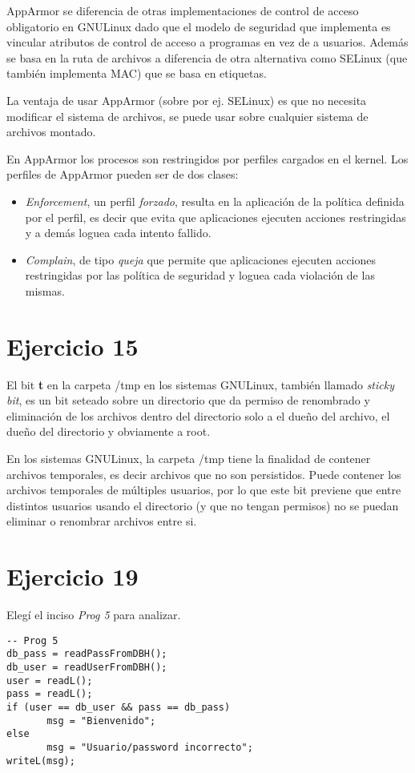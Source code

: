 \documentclass[12pt]{article}%
\begin{document}
AppArmor se diferencia de otras implementaciones de control de acceso
obligatorio en GNU\-Linux dado que el modelo de seguridad que
implementa es vincular atributos de control de acceso a programas en
vez de a usuarios. Además se basa en la ruta de archivos a diferencia
de otra alternativa como SELinux (que también implementa MAC) que se
basa en etiquetas.

La ventaja de usar AppArmor (sobre por ej. SELinux) es que no necesita
modificar el sistema de archivos, se puede usar sobre cualquier
sistema de archivos montado.

En AppArmor los procesos son restringidos por perfiles cargados en el
kernel. Los perfiles de AppArmor pueden ser de dos clases:
\begin{itemize}
\item \textit{Enforcement}, un perfil \textit{forzado}, resulta en la
  aplicación de la política definida por el perfil, es decir que evita
  que aplicaciones ejecuten acciones restringidas y a demás loguea cada
  intento fallido.
\item \textit{Complain}, de tipo \textit{queja} que permite que aplicaciones
  ejecuten acciones restringidas por las política de seguridad y
  loguea cada violación de las mismas.
\end{itemize}

\section*{Ejercicio 15}
El bit \textbf{t} en la carpeta /tmp en los sistemas GNU\-Linux,
también llamado \textit{sticky bit}, es un bit seteado sobre un
directorio que da permiso de renombrado y eliminación de los
archivos dentro del directorio solo a el dueño del archivo, el dueño
del directorio y obviamente a root.

En los sistemas GNU\-Linux, la carpeta /tmp tiene la finalidad de
contener archivos temporales, es decir archivos que no son
persistidos. Puede contener los archivos temporales de múltiples
usuarios, por lo que este bit previene que entre distintos usuarios
usando el directorio (y que no tengan permisos) no se puedan eliminar
o renombrar archivos entre si.

\section*{Ejercicio 19}
Elegí el inciso \textit{Prog 5} para analizar.
\begin{verbatim}
-- Prog 5
db_pass = readPassFromDBH();
db_user = readUserFromDBH();
user = readL();
pass = readL();
if (user == db_user && pass == db_pass)
       msg = "Bienvenido";
else
       msg = "Usuario/password incorrecto";
writeL(msg);
\end{verbatim}
\end{document}
